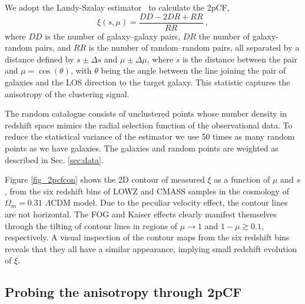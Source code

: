 \documentclass[iop]{emulateapj}
\begin{document}
We adopt the Landy-Szalay estimator~\citep{1993ApJ...412...64L} to calculate the 2pCF,
\begin{equation}
\xi(s,\mu)=\frac{DD-2DR+RR}{RR}\ ,
\end{equation}
where $DD$ is the number of galaxy--galaxy pairs, 
$DR$ the number of galaxy-random pairs, 
and $RR$ is the number of random--random pairs, 
all separated by a distance defined by $s\pm\Delta s$ and $\mu\pm\Delta\mu$, 
where $s$ is the distance between the pair and $\mu=\cos(\theta)$, 
with $\theta$ being the angle between the line joining the pair of galaxies and the LOS direction to the target galaxy. 
This statistic captures the anisotropy of the clustering signal.

The random catalogue consists of unclustered points whose number density in redshift space mimics the radial selection function of the observational data. 
To reduce the statistical variance of the estimator we use 50 times as many random points as we have galaxies.
The galaxies and random points are weighted as described in Sec. \ref{sec:data}.

Figure \ref{fig_2pcfcon} shows the 2D contour of measured $\xi$ as a function of $\mu$ and $s$,
from the six redshift bins of LOWZ and CMASS samples 
in the cosmology of $\Omega_m=0.31$ $\Lambda$CDM model.
Due to the peculiar velocity effect, the contour lines are not horizontal.
The FOG \citep{FOG} and Kaiser \citep{Kaiser1987} effects 
clearly manifest themselves through the tilting of contour lines in regions of $\mu \rightarrow 1$ and $1-\mu \gtrsim0.1$, respectively.
A visual inspection of the contour maps from the six redshift bins 
reveals that they all have a similar appearance,
implying small redshift evolution of $\xi$.

\subsection{Probing the anisotropy through 2pCF}
\end{document}
